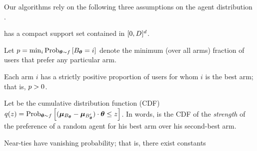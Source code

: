 Our algorithms rely on the following three assumptions on the agent distribution
\AgentDist.

\begin{assumption} \label{A2}
\AgentDist has a compact support set contained in $[0,D]^d$.
\end{assumption}

Let $\MinProb = \min_{i} \Prob[\AgV \sim \AgentDist]{\Best{\AgV} = i}$
denote the minimum (over all arms) fraction of users that prefer any
particular arm.

\begin{assumption} \label{A3}
Each arm $i$ has a strictly positive proportion of users for whom $i$
is the best arm; that is, $p > 0$.
\end{assumption}



Let  be the cumulative distribution function (CDF)
$\AlmostTied{z} = \Prob[\AgV \sim \AgentDist]{%
  (\ArmV{\Best{\AgV}}-\ArmV{\Second{\AgV}}) \cdot \AgV \leq z}$.
In words,  is the CDF of the \emph{strength} of the
preference of a random agent for his best arm over his second-best arm.

\begin{assumption} \label{A1}
Near-ties have vanishing probability; 
that is, there exist constants
\end{assumption}


